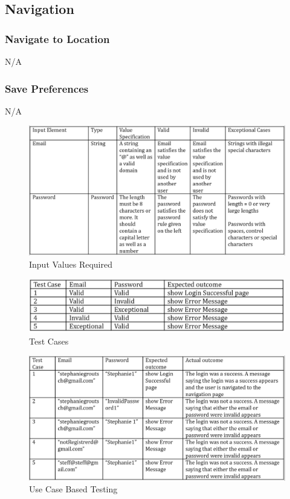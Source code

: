\documentclass[english]{article}
\begin{document}
\subsection{Navigation}

\subsubsection{Navigate to Location}
N/A
\subsubsection{Save Preferences}
N/A

	\begin{figure}[H]
\centering
\includegraphics[width=1.0\textwidth]{registration_input_values_required}
\caption{Input Values Required}
\end{figure}

\begin{figure}[H]
\centering
\includegraphics[width=1.0\textwidth]{registration_test_cases}
\caption{Test Cases}
\end{figure}

\begin{figure}[H]
\centering
\includegraphics[width=1.0\textwidth]{registration_use_case_based_testing}
\caption{Use Case Based Testing}
\end{figure}
	
\end{document}
